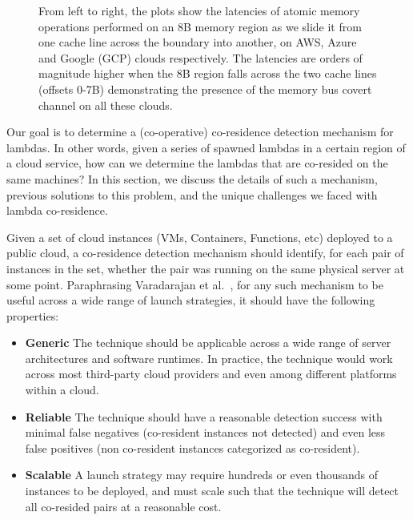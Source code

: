 \begin{figure}[h!]
\begin{subfigure}{.33\textwidth}
\end{subfigure}
\caption{From left to right, the plots show the latencies of atomic 
      memory operations performed on an 8B memory region as we slide it 
      from one cache line across the boundary into another, on AWS, Azure and 
      Google (GCP) clouds respectively. The latencies 
      are orders of magnitude higher when the 8B region falls across the 
      two cache lines (offsets 0-7B) demonstrating the presence of 
      the memory bus covert channel on all these clouds. \label{fig:membus_clouds}}
\label{fig:fig}
\end{figure}


Our goal is to determine a (co-operative) co-residence detection mechanism for
lambdas. In other words, given a series of spawned lambdas in a
certain region of a cloud service, how can we determine the lambdas that are
co-resided on the same machines?  In this section, we discuss the details of
such a mechanism, previous solutions to this problem, and the unique challenges
we faced with lambda co-residence.

Given a set of cloud instances (VMs, Containers, Functions, etc) deployed to a
public cloud, a co-residence detection mechanism should identify, for each pair
of instances in the set, whether the pair was running on the same physical
server at some point. Paraphrasing Varadarajan et al.~\cite{varadarajan2015},
for any such mechanism to be useful across a wide range of launch strategies, it
should have the following properties:

\begin{itemize}
    \item \textbf{Generic} The technique should be applicable across a wide
    range of server architectures and software runtimes. In practice, the
    technique would work across most third-party cloud providers and even among different
    platforms within a cloud.
    \item \textbf{Reliable} The technique should have a reasonable detection success
    with minimal false negatives (co-resident instances not detected) and even 
    less false positives (non co-resident instances categorized as co-resident).
    \item \textbf{Scalable} A launch strategy may require hundreds or even
    thousands of instances to be deployed, and must scale such that the
    technique will detect all co-resided pairs at a reasonable cost.
\end{itemize}

